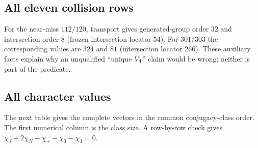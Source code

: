 \subsection{All eleven collision rows}


For the near-miss $112/120$, transport gives generated-group order $32$ and
intersection order $8$ (frozen intersection locator $54$).  For $301/303$
the corresponding values are $324$ and $81$ (intersection locator $266$).
These auxiliary facts explain why an unqualified ``unique $V_4$'' claim
would be wrong; neither is part of the predicate.

\subsection{All character values}

The next table gives the complete vectors in the common conjugacy-class
order.  The first numerical column is the class size.  A row-by-row check
gives $\chi_J+2\chi_N-\chi_+-\chi_0-\chi_3=0$.

